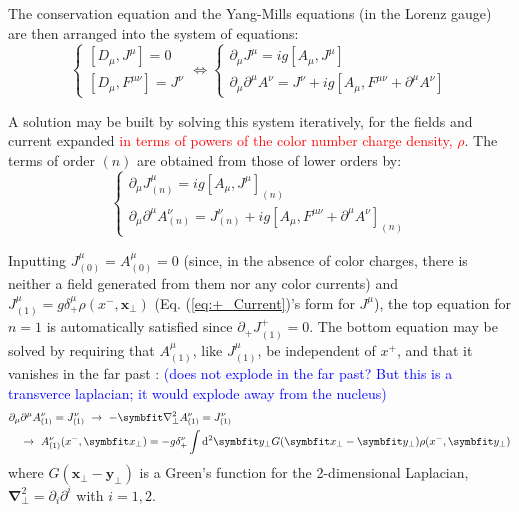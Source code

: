 The conservation equation and the Yang-Mills equations (in the Lorenz gauge) are then arranged into the system of equations:
\begin{equation}
	\begin{cases}
		[D_\mu, J^\mu] = 0 \\
		[D_\mu, F^{\mu \nu}] = J^\nu
	\end{cases} \Leftrightarrow
	\begin{cases}
		\partial_\mu J^\mu = ig[A_\mu, J^\mu]  \\
		\partial_\mu \partial^\mu A^\nu = J^\nu + ig [A_\mu, F^{\mu \nu} + \partial^\mu A^\nu]
	\end{cases}
\end{equation}

A solution may be built by solving this system iteratively, for the fields and current expanded \textcolor{red}{in terms of powers of the color number charge density, $\rho$}. The terms of order $(n)$ are obtained from those of lower orders by:
\begin{equation}
	\begin{cases}
		\partial_\mu J_{(n)}^\mu = ig[A_\mu, J^\mu]_{(n)}  \\
		\partial_\mu \partial^\mu A_{(n)}^\nu = J_{(n)}^\nu + ig [A_\mu, F^{\mu \nu} + \partial^\mu A^\nu]_{(n)}
	\end{cases}
\end{equation}


Inputting $J_{(0)}^\mu = A_{(0)}^\mu = 0$ (since, in the absence of color charges, there is neither a field generated from them nor any color currents) and $J_{(1)}^\mu = g \delta^{\mu}_+ \rho(x^-,\mathbf{x}_\perp)$  (Eq. (\ref{eq:+_Current})'s form for $J^\mu$), the top equation for $n=1$ is automatically satisfied since $\partial_+ J^+_{(1)} = 0$. The bottom equation may be solved by requiring that $A^\mu_{(1)}$, like $J_{(1)}^\mu$, be independent of $x^+$, and that it vanishes in the far past \cite{Blaizot:2004wu}: \textcolor{blue}{(does not explode in the far past? But this is a transverce laplacian; it would explode away from the nucleus)}
\begin{equation}
	\begin{split}
		\partial_\mu & \partial^\mu A_{(1)}^\nu = J_{(1)}^\nu ~ \to ~
		- \mathbf{\nabla}_\perp^2 A_{(1)}^\nu = J_{(1)}^\nu \\
		& \to ~ A^\nu_{(1)}(x^-,\mathbf{x}_\perp) = - g \delta^{\nu}_+  \int \diff^2 \mathbf{y}_\perp G(\mathbf{x_\perp} - \mathbf{y_\perp}) \rho(x^-,\mathbf{y}_\perp)
	\end{split}
\end{equation}
where $G(\mathbf{x_\perp} - \mathbf{y_\perp})$ is a Green's function for the 2-dimensional Laplacian, $\mathbf{\nabla}_\perp^2 = \partial_i \partial^i$ with $i=1,2$.


